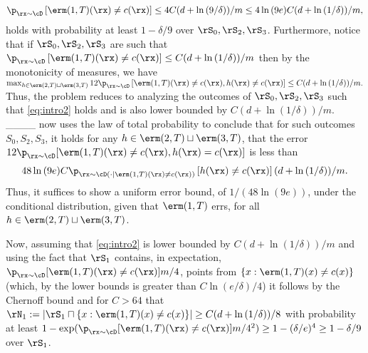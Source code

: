 \begin{align}\label{eq:intro2}
 \p_{\rx\sim\cD}\left[\erm(1,T)(\rx)\not=c(\rx)\right]\leq 4C(d+\ln{\left(9/\delta \right)})/m \leq 4\ln{\left(9e \right)}C(d+\ln{\left(1/\delta \right)})/m, 
\end{align}
holds with probability at least $1-\delta/9$ over $\rS_{0},\rS_{2},\rS_{3}$.
Furthermore, notice that if $\rS_{0},\rS_{2},\rS_{3}$ are such that $
    \p_{\rx\sim\cD}\left[\erm(1,T)(\rx)\not=c(\rx)\right]\leq C(d+\ln{\left(1/\delta \right)})/m $  then by the monotonicity of measures, we have
    $\max_{h\in \erm(2,T)\sqcup\erm(3,T)}    12\p_{\rx\sim\cD}\left[\erm(1,T)(\rx)\not= c(\rx),h(\rx)\not=c(\rx)\right] \leq C(d+\ln{\left(1/\delta \right)})/m.$ 
Thus, the problem reduces to analyzing the outcomes of $\rS_{0},\rS_{2},\rS_{3}$ such that \cref{eq:intro2} holds and is also lower bounded by $ C(d+\ln{\left(1/\delta \right)})/m .$ 
____ now uses the law of total probability to conclude that for such outcomes $ S_0,S_2,S_3 $, it holds for any $h\in \erm(2,T)\sqcup\erm(3,T)$, that the error $12\p_{\rx\sim\cD}[\erm(1,T)(\rx)\not= c(\rx),h(\rx)=c(\rx)]$ is less than 
\begin{align}\label{eq:intro4}
48\ln{\left(9e \right)}C \p_{\rx\sim\cD(\cdot \mid \erm(1,T)(\rx)\not=c(\rx))}\left[h(\rx)\not=c(\rx)\right] (d+ \ln{\left(1/\delta \right)}) /m.
    \end{align}
Thus, it suffices to show a uniform error bound, of $1/(48\ln{\left(9e \right)})$, under the conditional distribution, given that $\erm(1,T)$ errs, for all $h\in \erm(2,T)\sqcup\erm(3,T)$.

Now, assuming that \cref{eq:intro2} is lower bounded by $ C(d+\ln{\left(1/\delta \right)})/m $  and using the fact that $\rS_{1}$ contains, in expectation,
$\p_{\rx\sim\cD}[\erm(1,T)(\rx)\not=c(\rx)]m/4$, points from $\{x: \erm(1,T)(x)\not=c(x) \}$ (which, by the lower bounds is  greater than $C\ln{( e/\delta )}/4$) it follows by the Chernoff bound and for $C>64$ that $\rN_{1}:=|\rS_{1}\sqcap \{x: \erm(1,T)(x)\not=c(x) \}|\geq C(d+ \ln{(1/\delta )} )/8$ with probability at least 
$1-\exp(\p_{\rx\sim\cD}[\erm(1,T)(\rx)\not=c(\rx)]m/4^2)\geq 1-(\delta/e)^{4}\geq 1-\delta/9$  over $\rS_{1}$. 

